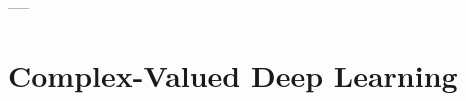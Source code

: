 \documentclass[a4paper,11pt]{book}
\begin{document}


\tableofcontents




-----

\part{Complex-Valued Deep Learning}





%
%
%
%

\newpage
\nocite{*}



\newpage
\appendix

\end{document}
